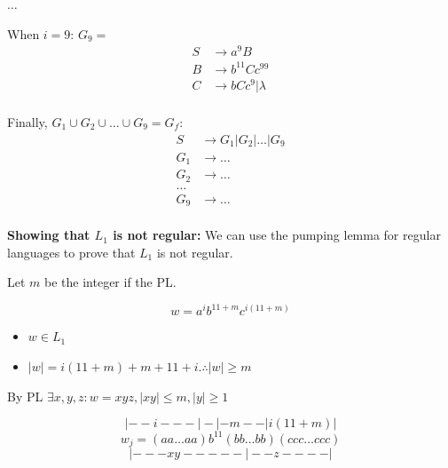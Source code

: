 \documentclass[12pt]{article}
\begin{document}
\begin{spacing}{1.5}
\begin{enumerate}
\begin{enumerate}
                              $\dots$

                              When $i=9$: $G_9=$
                              \begin{align*}
                                    S & \rightarrow a^9B          \\
                                    B & \rightarrow b^{11}Cc^{99} \\
                                    C & \rightarrow bCc^9|\lambda \\
                              \end{align*}

                              Finally, $G_1 \cup G_2 \cup \dots \cup G_9 = G_{f}:$
                              \begin{align*}
                                    S   & \rightarrow G_1 | G_2 | \dots | G_9 \\
                                    G_1 & \rightarrow \dots                   \\
                                    G_2 & \rightarrow \dots                   \\
                                    \dots                                     \\
                                    G_9 & \rightarrow \dots                   \\
                              \end{align*}

                              \textbf{Showing that $L_1$ is not regular:} We can use the pumping lemma for regular languages to prove that $L_1$ is not regular.

                              Let $m$ be the integer if the PL.

                              $$w = a^ib^{11+m}c^{i(11 + m)}$$
                              \begin{itemize}
                                    \item $w \in L_1$
                                    \item $|w|=i(11+m)+m+11+i. \therefore |w| \geq m$
                              \end{itemize}

                              By PL $\exists x,y,z : w = xyz, |xy| \leq m, |y| \geq 1$

                              $$|--i---|-|-m--|i(11+m)|$$
                              $$w_j=(aa\dots aa)b^{11}(bb\dots bb)(ccc\dots ccc)$$
                              $$|---xy-----|--z----|$$


\end{enumerate}
\end{enumerate}
\end{spacing}
\end{document}
